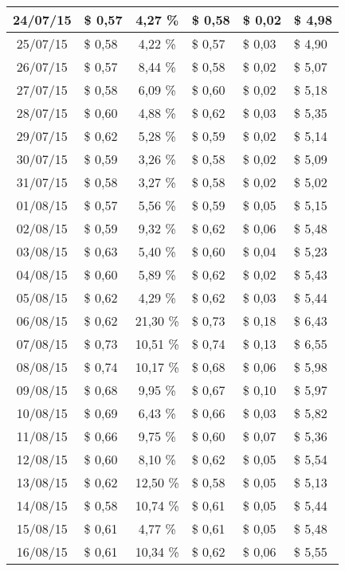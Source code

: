 \begin{center}
\begin{small}
\begin{longtable}{|c|l|c|l|l|l|}
24/07/15 & \$ 0,57 & 4,27 \% & \$ 0,58 & \$ 0,02 & \$ 4,98 \\ \hline
25/07/15 & \$ 0,58 & 4,22 \% & \$ 0,57 & \$ 0,03 & \$ 4,90 \\ \hline
26/07/15 & \$ 0,57 & 8,44 \% & \$ 0,58 & \$ 0,02 & \$ 5,07 \\ \hline
27/07/15 & \$ 0,58 & 6,09 \% & \$ 0,60 & \$ 0,02 & \$ 5,18 \\ \hline
28/07/15 & \$ 0,60 & 4,88 \% & \$ 0,62 & \$ 0,03 & \$ 5,35 \\ \hline
29/07/15 & \$ 0,62 & 5,28 \% & \$ 0,59 & \$ 0,02 & \$ 5,14 \\ \hline
30/07/15 & \$ 0,59 & 3,26 \% & \$ 0,58 & \$ 0,02 & \$ 5,09 \\ \hline
31/07/15 & \$ 0,58 & 3,27 \% & \$ 0,58 & \$ 0,02 & \$ 5,02 \\ \hline
01/08/15 & \$ 0,57 & 5,56 \% & \$ 0,59 & \$ 0,05 & \$ 5,15 \\ \hline
02/08/15 & \$ 0,59 & 9,32 \% & \$ 0,62 & \$ 0,06 & \$ 5,48 \\ \hline
03/08/15 & \$ 0,63 & 5,40 \% & \$ 0,60 & \$ 0,04 & \$ 5,23 \\ \hline
04/08/15 & \$ 0,60 & 5,89 \% & \$ 0,62 & \$ 0,02 & \$ 5,43 \\ \hline
05/08/15 & \$ 0,62 & 4,29 \% & \$ 0,62 & \$ 0,03 & \$ 5,44 \\ \hline
06/08/15 & \$ 0,62 & 21,30 \% & \$ 0,73 & \$ 0,18 & \$ 6,43 \\ \hline
07/08/15 & \$ 0,73 & 10,51 \% & \$ 0,74 & \$ 0,13 & \$ 6,55 \\ \hline
08/08/15 & \$ 0,74 & 10,17 \% & \$ 0,68 & \$ 0,06 & \$ 5,98 \\ \hline
09/08/15 & \$ 0,68 & 9,95 \% & \$ 0,67 & \$ 0,10 & \$ 5,97 \\ \hline
10/08/15 & \$ 0,69 & 6,43 \% & \$ 0,66 & \$ 0,03 & \$ 5,82 \\ \hline
11/08/15 & \$ 0,66 & 9,75 \% & \$ 0,60 & \$ 0,07 & \$ 5,36 \\ \hline
12/08/15 & \$ 0,60 & 8,10 \% & \$ 0,62 & \$ 0,05 & \$ 5,54 \\ \hline
13/08/15 & \$ 0,62 & 12,50 \% & \$ 0,58 & \$ 0,05 & \$ 5,13 \\ \hline
14/08/15 & \$ 0,58 & 10,74 \% & \$ 0,61 & \$ 0,05 & \$ 5,44 \\ \hline
15/08/15 & \$ 0,61 & 4,77 \% & \$ 0,61 & \$ 0,05 & \$ 5,48 \\ \hline
16/08/15 & \$ 0,61 & 10,34 \% & \$ 0,62 & \$ 0,06 & \$ 5,55 \\ \hline

\end{longtable}
\end{small}
\end{center}
